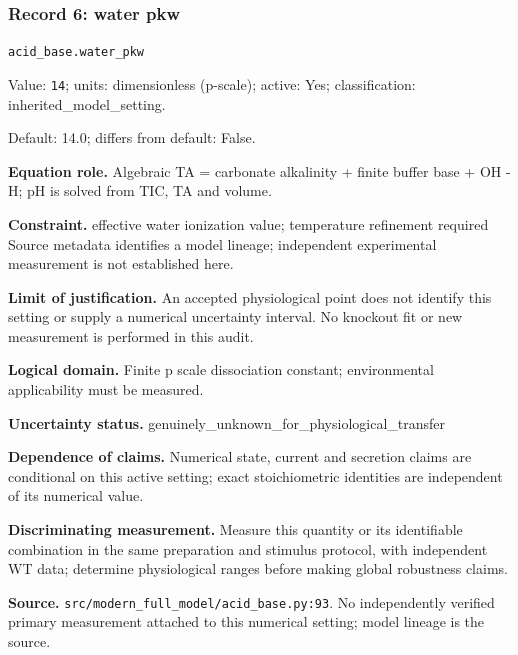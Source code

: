\subsubsection*{Record 6: water pkw}
{\small \nolinkurl{acid_base.water_pkw}\par

Value: \texttt{14}; units: dimensionless (p-scale); active: Yes; classification: inherited\_model\_setting.\par

Default: 14.0; differs from default: False.\par

\textbf{Equation role.} Algebraic TA = carbonate alkalinity + finite buffer base + OH - H; pH is solved from TIC, TA and volume.\par

\textbf{Constraint.} effective water ionization value; temperature refinement required Source metadata identifies a model lineage; independent experimental measurement is not established here.\par

\textbf{Limit of justification.} An accepted physiological point does not identify this setting or supply a numerical uncertainty interval. No knockout fit or new measurement is performed in this audit.\par

\textbf{Logical domain.} Finite p scale dissociation constant; environmental applicability must be measured.\par

\textbf{Uncertainty status.} genuinely\_unknown\_for\_physiological\_transfer\par

\textbf{Dependence of claims.} Numerical state, current and secretion claims are conditional on this active setting; exact stoichiometric identities are independent of its numerical value.\par

\textbf{Discriminating measurement.} Measure this quantity or its identifiable combination in the same preparation and stimulus protocol, with independent WT data; determine physiological ranges before making global robustness claims.\par

\textbf{Source.} \nolinkurl{src/modern_full_model/acid_base.py:93}. No independently verified primary measurement attached to this numerical setting; model lineage is the source.\par}


